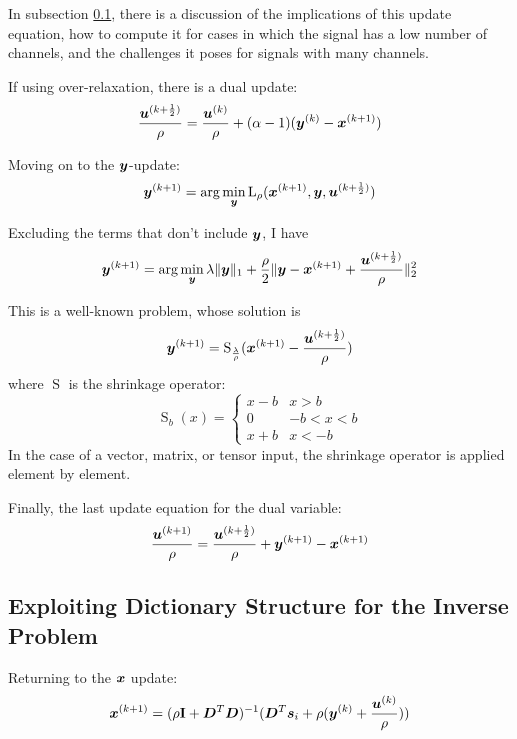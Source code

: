 In subsection \ref{subsection:SC xupdate}, there is a discussion of the implications of this update equation, how to compute it for cases in which the signal has a low number of channels, and the challenges it poses for signals with many channels.

If using over-relaxation, there is a dual update:
\begin{equation}
\frac{\bm{u}^{(k + \frac{1}{2})}}{\rho} = \frac{\bm{u}^{(k)}}{\rho} + (\alpha - 1)(\bm{y}^{(k)} - \bm{x}^{(k + 1)})
\end{equation}

Moving on to the $\bm{y}$-update:
\begin{equation}
\bm{y}^{(k + 1)} = \arg\min_{\bm{y}} \operatorname{L}_{\rho}(\bm{x}^{(k + 1)},\bm{y},\bm{u}^{(k + \frac{1}{2})})
\end{equation}

Excluding the terms that don't include $\bm{y}$, I have
\begin{equation}
\bm{y}^{(k + 1)} = \arg\min_{\bm{y}} \lambda\|\bm{y}\|_1 + \frac{\rho}{2}\|\bm{y} - \bm{x}^{(k + 1)} + \frac{\bm{u}^{(k + \frac{1}{2})}}{\rho}\|_2^2
\end{equation}

This is a well-known problem, whose solution is
\begin{equation}
\bm{y}^{(k + 1)} = \operatorname{S}_{\frac{\lambda}{\rho}}(\bm{x}^{(k + 1)} - \frac{\bm{u}^{(k + \frac{1}{2})}}{\rho})
\end{equation}
where $\operatorname{S}$ is the shrinkage operator:
\begin{equation}
\operatorname{S}_{b}(x) = \begin{cases} x - b & x > b \\ 0 & -b < x < b \\ x + b & x < - b \end{cases}
\end{equation}
In the case of a vector, matrix, or tensor input, the shrinkage operator is applied element by element.

Finally, the last update equation for the dual variable:
\begin{equation}
\frac{\bm{u}^{(k + 1)}}{\rho} = \frac{\bm{u}^{(k + \frac{1}{2})}}{\rho} + \bm{y}^{(k + 1)} - \bm{x}^{(k + 1)}
\end{equation}

\subsection{Exploiting Dictionary Structure for the Inverse Problem}
\label{subsection:SC xupdate}
Returning to the $\bm{x}$ update:
\begin{equation}
\bm{x}^{(k + 1)} = (\rho{\bf I} + \bm{D}^T\bm{D})^{-1}(\bm{D}^T\bm{s}_i + \rho(\bm{y}^{(k)} + \frac{\bm{u}^{(k)}}{\rho}))
\end{equation}

